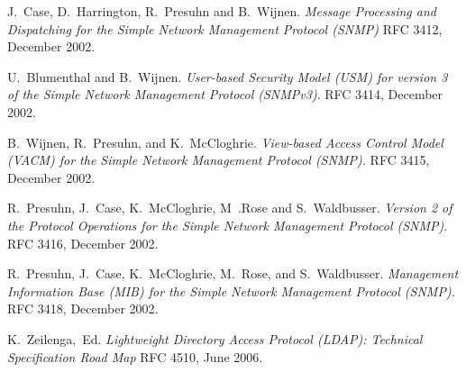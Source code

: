 \documentclass[reprint,9pt]{sigplanconf}
\begin{document}
\begin{thebibliography}{10}
J.~Case, D.~Harrington, R.~Presuhn and B.~Wijnen.
\newblock \textsl{Message Processing and Dispatching for the
               Simple Network Management Protocol (SNMP)}
\newblock RFC 3412, December 2002.

U.~Blumenthal and B.~Wijnen.
\newblock \textsl{User-based Security Model (USM) for version 3 of the
              Simple Network Management Protocol (SNMPv3)}.
\newblock RFC 3414, December 2002.

B.~Wijnen, R.~Presuhn, and K.~McCloghrie.
\newblock \textsl{View-based Access Control Model (VACM) for the
  Simple Network Management Protocol (SNMP).}
\newblock RFC 3415, December 2002.

R.~Presuhn, J.~Case, K.~McCloghrie, M~.Rose and S.~Waldbusser.
\newblock \textsl{Version 2 of the Protocol Operations for
             the Simple Network Management Protocol (SNMP)}.
\newblock RFC 3416, December 2002.

R.~Presuhn, J.~Case, K.~McCloghrie, M.~Rose, and S.~Waldbusser.
\newblock \textsl{Management Information Base (MIB) for the Simple
  Network Management Protocol (SNMP).}
\newblock RFC 3418, December 2002.

K.~Zeilenga,~Ed.
\newblock \textsl{Lightweight Directory Access Protocol (LDAP):
                    Technical Specification Road Map}
\newblock RFC 4510, June 2006.

\end{thebibliography}
\end{document}
